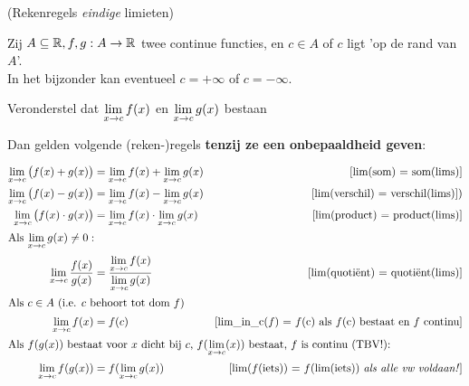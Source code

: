 \documentclass[numbers]{ximera}
\begin{document}
\begin{proposition} (Rekenregels \textit{eindige} limieten)
	
	Zij $A\subseteq\mathbb{R}, f,g:A\to\mathbb{R}$ twee continue functies, en $c\in A$ of $c$ ligt 'op de rand van $A$'. \\
	In het bijzonder kan eventueel $c=+\infty$ of $c=-\infty$. 
	
	Veronderstel dat $\limxc f(x)$ en $\limxc g(x)$ bestaan%
	
	Dan gelden volgende (reken-)regels  \textbf{\color{red} tenzij ze een {\large onbepaaldheid} geven}: 
	
	
	\begin{align}
		 \limxc \big(f(x) +g(x)\big) & = \limxc f(x) + \limxc g(x)  
		     & \text{[lim(som) = som(lims)]} \label{elim-som} \\
		 \limxc \big(f(x) -g(x)\big) & = \limxc f(x) - \limxc g(x)  
		     & \text{[lim(verschil) = verschil(lims)])} \label{elim-verschil}\\
		 \limxc \big(f(x)\cdot g(x)\big) & = \limxc f(x) \cdot \limxc g(x)  
		     & \text{[lim(product) =  product(lims)]} \label{elim-product} \\
		 \intertext{Als $\limxc g(x) \neq 0:$}
		 \limxc \dfrac{f(x)}{g(x)} & = \dfrac{\limxc f(x)}{\limxc g(x)}  
		     & \text{[lim(quotiënt) = quotiënt(lims)]} \label{elim-quotient} \\
		 \intertext{Als $c\in A$ (i.e. $c$ behoort tot dom $f$)} %
		 \limxc f(x) & = f(c) 
		     & \text{[lim\_in\_c($f$) = $f$(c) als $f$(c) bestaat en $f$ continu]} \label{elim-domein} \\
		 \intertext{Als $f(g(x))$ bestaat voor $x$ dicht bij $c$, $f(\limxc(x))$ bestaat, $f$ is continu (TBV!):} 
		 \limxc f(g(x)) & = f(\limxc g(x)) 
		     & \text{[lim($f$(iets)) =  $f$(lim(iets)) \textit{als alle vw voldaan!}]} \label{elim-continu} 
	\end{align}
\end{proposition}
\end{document}
